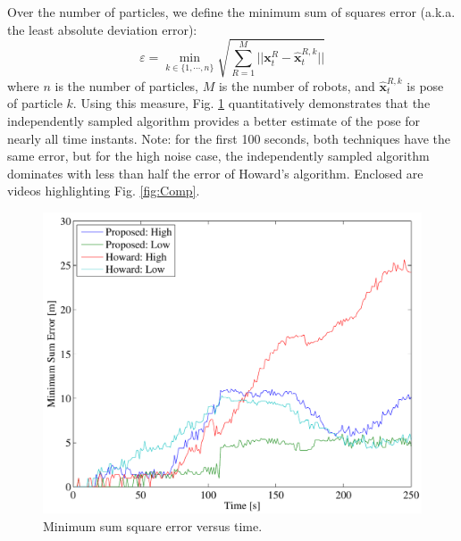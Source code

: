 Over the number of particles, we define the minimum sum of squares error (a.k.a. the least absolute deviation error):
\begin{equation}
\varepsilon=\min_{k\in\{1,\cdots,n\}}\sqrt{\sum_{R=1}^{M} ||\textbf{x}_{t}^R-\hat{\textbf{x}}^{R,k}_{t}||}
\end{equation}
where $n$ is the number of particles, $M$ is the number of robots, and $\hat{\textbf{x}}^{R,k}_{t}$ is pose of particle $k$.  Using this measure, Fig. \ref{fig:minsumerr} quantitatively demonstrates that the independently sampled algorithm provides a better estimate of the pose for nearly all time instants.  Note: for the first 100 seconds, both techniques have the same error, but for the high noise case, the independently sampled algorithm dominates with less than half the error of Howard's algorithm.  Enclosed are videos highlighting Fig. \ref{fig:Comp}.




\begin{figure}[h]
\centering
\includegraphics[width=\columnwidth]{../FinalFigures/MinSumError}
\caption{Minimum sum square error versus time.}
\label{fig:minsumerr}
\end{figure}